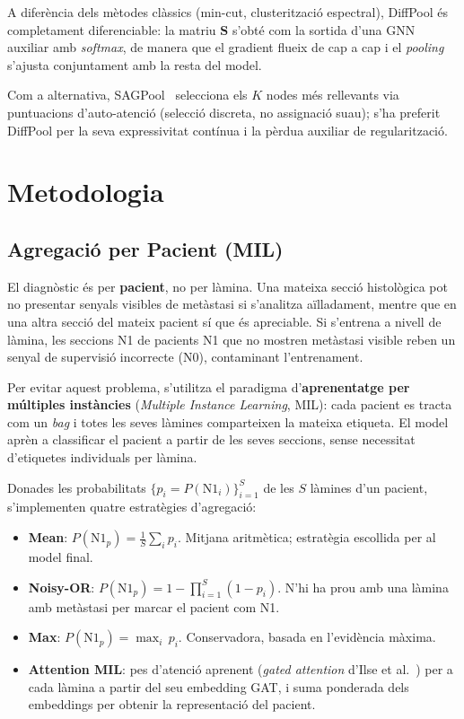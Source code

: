 \documentclass[10pt,a4paper,twocolumn,twoside]{article}
\begin{document}
A diferència dels mètodes clàssics (min-cut, clusterització espectral), DiffPool és completament diferenciable: la matriu $\mathbf{S}$ s'obté com la sortida d'una GNN auxiliar amb \textit{softmax}, de manera que el gradient flueix de cap a cap i el \textit{pooling} s'ajusta conjuntament amb la resta del model.

Com a alternativa, SAGPool~\cite{lee2019selfattentiongraphpooling} selecciona els $K$ nodes més
rellevants via puntuacions d'auto-atenció (selecció discreta, no assignació suau); s'ha preferit
DiffPool per la seva expressivitat contínua i la pèrdua auxiliar de regularització.


\section{Metodologia}

\subsection{Agregació per Pacient (MIL)}
\label{sec:mil}

El diagnòstic és per \textbf{pacient}, no per làmina. Una mateixa secció histològica pot no presentar senyals
visibles de metàstasi si s'analitza aïlladament, mentre que en una altra secció del mateix pacient sí que és
apreciable. Si s'entrena a nivell de làmina, les seccions N1 de pacients N1 que no mostren metàstasi visible
reben un senyal de supervisió incorrecte (N0), contaminant l'entrenament.

Per evitar aquest problema, s'utilitza el paradigma d'\textbf{aprenentatge per múltiples instàncies}
(\textit{Multiple Instance Learning}, MIL): cada pacient es tracta com un \textit{bag} i totes les seves
làmines comparteixen la mateixa etiqueta. El model aprèn a classificar el pacient a partir de les
seves seccions, sense necessitat d'etiquetes individuals per làmina.

Donades les probabilitats $\{p_i = P(\text{N1}_i)\}_{i=1}^{S}$ de les $S$ làmines d'un pacient,
s'implementen quatre estratègies d'agregació:

\begin{itemize}
    \item \textbf{Mean}: $P(\text{N1}_{p}) = \frac{1}{S}\sum_i p_i$. Mitjana aritmètica;
    estratègia escollida per al model final.
    \item \textbf{Noisy-OR}: $P(\text{N1}_{p}) = 1 - \prod_{i=1}^{S}(1 - p_i)$. N'hi ha prou
    amb una làmina amb metàstasi per marcar el pacient com N1.
    \item \textbf{Max}: $P(\text{N1}_{p}) = \max_i\, p_i$. Conservadora, basada en l'evidència
    màxima.
    \item \textbf{Attention MIL}: pes d'atenció aprenent (\textit{gated attention} d'Ilse et
    al.~\cite{ilse2018attentionbaseddeepmultipleinstance}) per a cada làmina a partir del seu
    embedding GAT, i suma ponderada dels embeddings per obtenir la representació del pacient.
\end{itemize}
\end{document}
